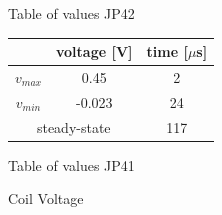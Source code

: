 \documentclass[notitlepage, a4paper, 11pt]{article}
\begin{document}
\begin{figure}[H]
\begin{subtable}{0.3 \textwidth}
\begin{tabular}{|c|c|c|}
	\hline
\end{tabular}
			\caption{Table of values JP42}
		\end{subtable}
		\hfill
		\begin{subtable}{0.3 \textwidth}
			\centering
			\begin{tabular}{|c|c|c|}
	\hline
	& voltage [V] & time [$\mu$s] \\
	\hline
	$v_{max}$ & 0.45 & 2 \\
	\hline
	$v_{min}$ & -0.023 & 24 \\
	\hline
	\multicolumn{2}{|c|}{ steady-state} & 117 \\
	\hline
\end{tabular}
			\caption{Table of values JP41}
		\end{subtable}
		\caption{Coil Voltage}
	\end{figure}
	
\end{document}
